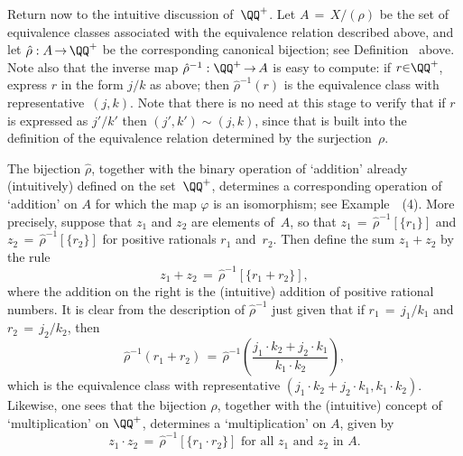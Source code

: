         Return now to the intuitive discussion of~${\QQ}^{+}$. Let $A \,=\, X/({\rho})$ be the set of equivalence classes associated with the equivalence relation described above,
    and let $\hat{{\rho}}:A \,{\rightarrow}\, {\QQ}^{+}$ be the corresponding canonical bijection; see Definition~ above.
   Note also that the inverse map $\hat{{\rho}}^{-1}:{\QQ}^{+} \,{\rightarrow}\, A$ is easy to compute:
    if $r{\in}{\QQ}^{+}$, express $r$ in the form $j/k$ as above; then $\hat{{\rho}}^{-1}(r)$ is the equivalence class with representative~$(j,k)$.
    Note that there is no need at this stage to verify that if $r$ is expressed as $j'/k'$ then $(j',k'){\sim}(j,k)$,
    since that is built into the definition of the equivalence relation determined by the surjection~${\rho}$.

        The bijection $\hat{{\rho}}$, together with the binary operation of `addition' already (intuitively) defined on the set~${\QQ}^{+}$,
    determines a corresponding operation of `addition' on $A$ for which the map ${\varphi}$ is an isomorphism; see Example~~(4).
    More precisely, suppose that $z_{1}$ and $z_{2}$ are elements of~$A$,
    so that $z_{1} \,=\, \hat{{\rho}}^{-1}[\{r_{1}\}]$ and $z_{2} \,=\, \hat{{\rho}}^{-1}[\{r_{2}\}]$ for positive rationals $r_{1}$ and~$r_{2}$. Then define the sum $z_{1} + z_{2}$ by the rule
        \begin{displaymath}
        z_{1} + z_{2} \,=\, \hat{{\rho}}^{-1}[\{r_{1}+r_{2}\}],
        \end{displaymath}
    where the addition on the right is the (intuitive) addition of positive rational numbers.
    It is clear from the description of $\hat{{\rho}}^{-1}$ just given that if $r_{1} \,=\, j_{1}/k_{1}$ and $r_{2} \,=\, j_{2}/k_{2}$,
    then 
        \begin{displaymath}
        \hat{{\rho}}^{-1}(r_{1} + r_{2})
    \,=\, 
        \hat{{\rho}}^{-1}\left(\frac{j_{1}{\cdot}k_{2} + j_{2}{\cdot}k_{1}}{k_{1}{\cdot}k_{2}}\right),
        \end{displaymath}
    which is the equivalence class with representative $(j_{1}{\cdot}k_{2} + j_{2}{\cdot}k_{1}, k_{1}{\cdot}k_{2})$.
    Likewise, one sees that the bijection ${\rho}$, together with the (intuitive) concept of `multiplication' on ${\QQ}^{+}$,
    determines a `multiplication' on $A$, given by
        \begin{displaymath}
        z_{1}{\cdot}z_{2} \,=\, \hat{{\rho}}^{-1}[\{r_{1}{\cdot}r_{2}\}] \mbox{ for all $z_{1}$ and $z_{2}$ in $A$}.
        \end{displaymath}
